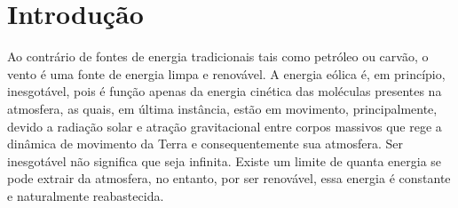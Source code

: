 \documentclass[
	12pt,				%
	openright,			%
	oneside,			%
	a4paper,			%
	english,			%
	french,				%
	spanish,			%
	brazil				%
	]{abntex2}
\begin{document}
\tableofcontents*



\textual

\chapter*[Introdução]{Introdução}



Ao contrário de fontes de energia tradicionais tais como petróleo ou carvão, o vento é uma fonte de energia limpa e renovável. A energia eólica é, em princípio, inesgotável, pois é função apenas da energia cinética das moléculas presentes na atmosfera, as quais, em última instância, estão em movimento, principalmente, devido a radiação solar e atração gravitacional entre corpos massivos que rege a dinâmica de movimento da Terra e consequentemente sua atmosfera. Ser inesgotável não significa que seja infinita. Existe um limite de quanta energia se pode extrair da atmosfera, no entanto, por ser renovável, essa energia é constante e naturalmente reabastecida.
\end{document}
